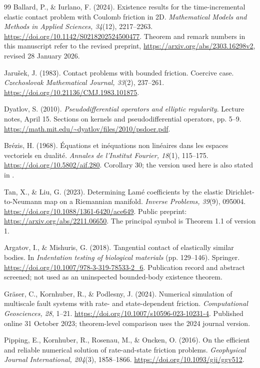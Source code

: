 \documentclass[11pt,a4paper]{article}
\theoremstyle{definition}\newtheorem{definition}[theorem]{Definition}
\theoremstyle{remark}\newtheorem{remark}[theorem]{Remark}
\numberwithin{equation}{section}
\begin{document}
\begin{thebibliography}{99}
Ballard, P., \& Iurlano, F. (2024).
Existence results for the time-incremental elastic contact problem with Coulomb friction in 2D.
\emph{Mathematical Models and Methods in Applied Sciences, 34}(12), 2217--2263.
\url{https://doi.org/10.1142/S0218202524500477}.
Theorem and remark numbers in this manuscript refer to the revised preprint,
\url{https://arxiv.org/abs/2303.16298v2}, revised 28 January 2026.

Jaru\v{s}ek, J. (1983). Contact problems with bounded friction. Coercive case.
\emph{Czechoslovak Mathematical Journal, 33}(2), 237--261.
\url{https://doi.org/10.21136/CMJ.1983.101875}.

Dyatlov, S. (2010). \emph{Pseudodifferential operators and elliptic regularity}.
Lecture notes, April 15. Sections on kernels and pseudodifferential operators, pp. 5--9.
\url{https://math.mit.edu/~dyatlov/files/2010/psdoer.pdf}.

Br\'ezis, H. (1968). \'Equations et in\'equations non lin\'eaires dans les espaces vectoriels en dualit\'e.
\emph{Annales de l'Institut Fourier, 18}(1), 115--175.
\url{https://doi.org/10.5802/aif.280}. Corollary 30; the version used here is also stated in \cite[Theorem A.3]{BI}.

Tan, X., \& Liu, G. (2023). Determining Lam\'e coefficients by the elastic Dirichlet-to-Neumann map on a Riemannian manifold.
\emph{Inverse Problems, 39}(9), 095004.
\url{https://doi.org/10.1088/1361-6420/ace649}.
Public preprint: \url{https://arxiv.org/abs/2211.06650}. The principal symbol is Theorem 1.1 of version 1.

Argatov, I., \& Mishuris, G. (2018). Tangential contact of elastically similar bodies.
In \emph{Indentation testing of biological materials} (pp. 129--146). Springer.
\url{https://doi.org/10.1007/978-3-319-78533-2_6}.
Publication record and abstract screened; not used as an uninspected bounded-body existence theorem.

Gr\"aser, C., Kornhuber, R., \& Podlesny, J. (2024). Numerical simulation of multiscale fault systems with rate- and state-dependent friction.
\emph{Computational Geosciences, 28}, 1--21.
\url{https://doi.org/10.1007/s10596-023-10231-4}.
Published online 31 October 2023; theorem-level comparison uses the 2024 journal version.

Pipping, E., Kornhuber, R., Rosenau, M., \& Oncken, O. (2016). On the efficient and reliable numerical solution of rate-and-state friction problems.
\emph{Geophysical Journal International, 204}(3), 1858--1866.
\url{https://doi.org/10.1093/gji/ggv512}.


\end{thebibliography}
\end{document}
